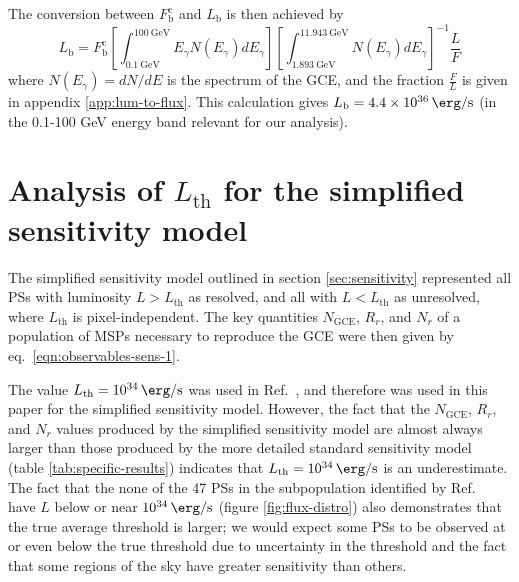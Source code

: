 \documentclass[letter,11pt]{article}
\newcommand{\brackets}[1]{\left[#1\right]}
\begin{document}
The conversion between $F^\text{c}_\text{b}$ and $L_\text{b}$ is then achieved by
\begin{equation}
    L_\text{b} = F^\text{c}_\text{b}\brackets{\int_{\SI{0.1}{\giga\electronvolt}}^{\SI{100}{\giga\electronvolt}}E_\gamma N(E_\gamma) dE_\gamma}
    \brackets{\int_{\SI{1.893}{\giga\electronvolt}}^{\SI{11.943}{\giga\electronvolt}} N(E_\gamma) dE_\gamma}^{-1} \frac{L}{F}
    \label{eqn:nptf-break-flux}
\end{equation}
where $N(E_\gamma) = dN/dE$ is the spectrum of the GCE, and the fraction $\frac{F}{L}$ is given in appendix \ref{app:lum-to-flux}. This calculation gives $L_\text{b} = \SI{4.4e+36}{\erg\per\second}$ (in the 0.1-100 GeV energy band relevant for our analysis).


\section{Analysis of $L_\text{th}$ for the simplified sensitivity model}
\label{app:step-thresh}
The simplified sensitivity model outlined in section \ref{sec:sensitivity} represented all PSs with luminosity $L>L_\text{th}$ as resolved, and all with $L<L_\text{th}$ as unresolved, where $L_\text{th}$ is pixel-independent. The key quantities $N_\text{GCE}$, $R_r$, and $N_{r}$ of a population of MSPs necessary to reproduce the GCE were then given by eq.~\ref{eqn:observables-sens-1}.

The value $L_\text{th}=\SI{e34}{\erg\per\second}$ was used in Ref.~\cite{Zhong:2019ycb}, and therefore was used in this paper for the simplified sensitivity model. However, the fact that the $N_\text{GCE}$, $R_r$, and $N_{r}$ values produced by the simplified sensitivity model are almost always larger than those produced by the more detailed standard sensitivity model (table \ref{tab:specific-results}) indicates that  $L_\text{th}=\SI{e34}{\erg\per\second}$ is an underestimate.
The fact that the none of the 47 PSs in the subpopulation identified by Ref.~\cite{Zhong:2019ycb} have $L$ below or near $\SI{e34}{\erg\per\second}$ (figure \ref{fig:flux-distro}) also demonstrates that the true average threshold is larger; we would expect some PSs to be observed at or even below the true threshold due to uncertainty in the threshold and the fact that some regions of the sky have greater sensitivity than others.
\end{document}
